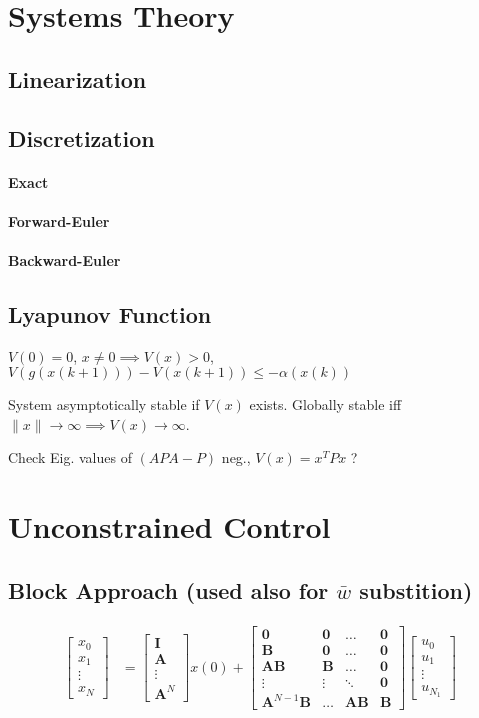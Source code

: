 \documentclass[landscape,a4paper,8pt]{scrartcl}
\newcommand\vA{\bm{A}}
\newcommand\vB{\bm{B}}
\newcommand\vI{\bm{I}}
\newcommand{\Me}[1]{\begin{bmatrix}#1\end{bmatrix}} %
\begin{document}

\begin{multicols*}{3}
\section{Systems Theory}
\subsection{Linearization}
\subsection{Discretization}
\paragraph{Exact}
\paragraph{Forward-Euler}
\paragraph{Backward-Euler}
\subsection{Lyapunov Function}
$V(0) = 0$, $x \neq 0 \implies V(x) > 0$, $V(g(x(k+1))) - V(x(k+1)) \leq - \alpha(x(k))$

System asymptotically stable if $V(x)$ exists.
Globally stable iff $\lVert x \rVert \rightarrow \infty \implies V(x) \rightarrow \infty$.

Check Eig. values of $(APA-P)$ neg., $V(x) = x^TPx$ ?

\section{Unconstrained Control}
\subsection{Block Approach (used also for $\bar w$ substition)}
	\begin{align*}
		\Me{x_0 \\ x_1 \\ \vdots \\ x_N } & = \Me{\vI \\ \vA \\ \vdots \\ \vA^N}x(0) + \Me{\bm 0 & \bm 0 & \dots & \bm 0 \\ \vB & \bm 0 & \dots & \bm 0 \\ \vA\vB & \vB & \dots & \bm 0 \\ \vdots & \vdots & \ddots & \bm 0 \\ \vA^{N-1}\vB & \dots & \vA\vB & \vB}\Me{u_0 \\ u_1 \\ \vdots \\ u_{N_1}}
	\end{align*}


\end{multicols*}
\end{document}
